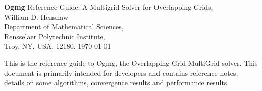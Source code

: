 \documentclass{article}
\begin{document}

\newcommand{\ogen}{\homeHenshaw/res/ogen}
\newcommand{\figures}{\homeHenshaw/Overture/docFigures}
\newcommand{\automg}{\homeHenshaw/papers/automg}
\newcommand{\ogmgDir}{\homeHenshaw/Overture/ogmg/doc}
\newcommand{\ogmgDocDir}{\homeHenshaw/Overture/ogmg/doc}

\newcommand{\Ogen}{{Ogen}}
\newcommand{\Overture}{{Overture}}
\newcommand{\Ogmg}{{Ogmg}}

\newcommand{\tablefontsize}{\footnotesize}
\newcommand{\clipfig}{}




\baselineskip
\begin{flushleft}
{\Large
  {\bf Ogmg} Reference Guide: A Multigrid Solver for Overlapping Grids,\\
}
\vspace{2\baselineskip}
William D. Henshaw  \\
Department of Mathematical Sciences, \\
Rensselaer Polytechnic Institute, \\
Troy, NY, USA, 12180.
\vspace{\baselineskip}
\today\\
\vspace{\baselineskip}

\vspace{4\baselineskip}

This is the reference guide to \Ogmg, the Overlapping-Grid-MultiGrid-solver.
This document is primarily intended for developers and contains reference notes,
details on some algorithms, 
convergence results and performance results. 


\end{flushleft}
\end{document}
